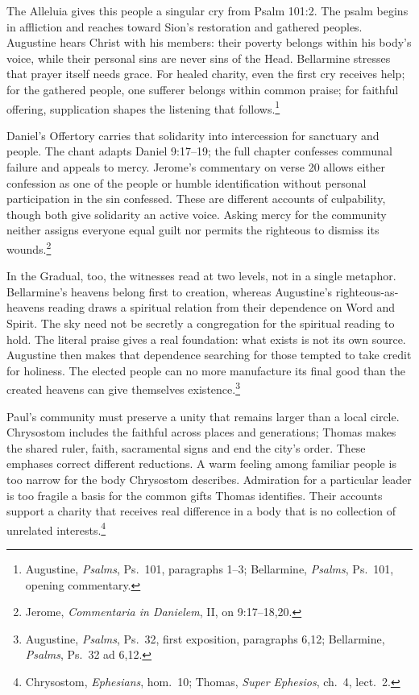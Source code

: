 The Alleluia gives this people a singular cry from Psalm 101:2. The psalm begins in affliction and reaches toward Sion's restoration and gathered peoples. Augustine hears Christ with his members: their poverty belongs within his body's voice, while their personal sins are never sins of the Head. Bellarmine stresses that prayer itself needs grace. For healed charity, even the first cry receives help; for the gathered people, one sufferer belongs within common praise; for faithful offering, supplication shapes the listening that follows.\footnote{Augustine, \textit{Psalms}, Ps.~101, paragraphs 1--3; Bellarmine, \textit{Psalms}, Ps.~101, opening commentary.}

Daniel's Offertory carries that solidarity into intercession for sanctuary and people. The chant adapts Daniel 9:17--19; the full chapter confesses communal failure and appeals to mercy. Jerome's commentary on verse 20 allows either confession as one of the people or humble identification without personal participation in the sin confessed. These are different accounts of culpability, though both give solidarity an active voice. Asking mercy for the community neither assigns everyone equal guilt nor permits the righteous to dismiss its wounds.\footnote{Jerome, \textit{Commentaria in Danielem}, II, on 9:17--18,20.}

In the Gradual, too, the witnesses read at two levels, not in a single metaphor. Bellarmine's heavens belong first to creation, whereas Augustine's righteous-as-heavens reading draws a spiritual relation from their dependence on Word and Spirit. The sky need not be secretly a congregation for the spiritual reading to hold. The literal praise gives a real foundation: what exists is not its own source. Augustine then makes that dependence searching for those tempted to take credit for holiness. The elected people can no more manufacture its final good than the created heavens can give themselves existence.\footnote{Augustine, \textit{Psalms}, Ps.~32, first exposition, paragraphs 6,12; Bellarmine, \textit{Psalms}, Ps.~32 ad 6,12.}

Paul's community must preserve a unity that remains larger than a local circle. Chrysostom includes the faithful across places and generations; Thomas makes the shared ruler, faith, sacramental signs and end the city's order. These emphases correct different reductions. A warm feeling among familiar people is too narrow for the body Chrysostom describes. Admiration for a particular leader is too fragile a basis for the common gifts Thomas identifies. Their accounts support a charity that receives real difference in a body that is no collection of unrelated interests.\footnote{Chrysostom, \textit{Ephesians}, hom.~10; Thomas, \textit{Super Ephesios}, ch.~4, lect.~2.}


